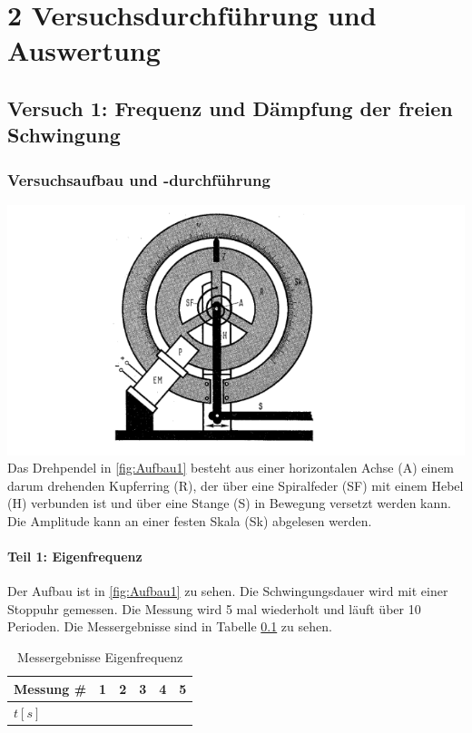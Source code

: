 \chapter*{2 Versuchsdurchführung und Auswertung}
\setcounter{chapter}{2}
\setcounter{section}{0}
\setcounter{subsection}{0}

\section{Versuch 1: Frequenz und Dämpfung der freien Schwingung}

    \subsection{Versuchsaufbau und -durchführung}

    \includegraphics[width=\textwidth]{bilder/Aufbau.png}
    \label{fig:Aufbau1}
    Das Drehpendel in \ref{fig:Aufbau1} besteht aus einer horizontalen Achse (A) einem darum 
    drehenden Kupferring (R), der über eine Spiralfeder (SF) mit einem Hebel (H) verbunden ist und über eine Stange (S) in Bewegung versetzt werden kann.
    Die Amplitude kann an einer festen Skala (Sk) abgelesen werden.

    
    \subsubsection{Teil 1: Eigenfrequenz}
    Der Aufbau ist in \ref{fig:Aufbau1} zu sehen. Die Schwingungsdauer wird mit einer Stoppuhr gemessen. Die Messung wird 5 mal wiederholt und läuft über 10 Perioden.
    Die Messergebnisse sind in Tabelle \ref{tab:Eigenfrequenz} zu sehen.

    \begin{table}[H]
        \centering
        \label{tab:Eigenfrequenz}
        \caption{Messergebnisse Eigenfrequenz}
        \begin{tabular}{|l|l|l|l|l|l|}
            \hline
            Messung \# & 1 & 2 & 3 & 4 & 5\\
            \hline
            $t[s]$ & & & & & \\
            \hline
        \end{tabular}
    \end{table}    

